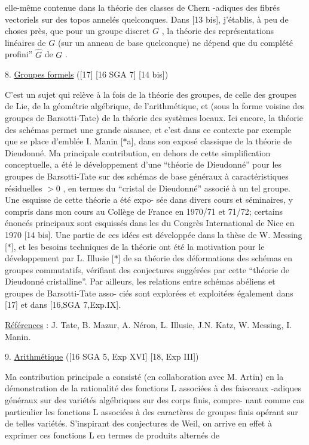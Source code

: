 
elle-même contenue dans la théorie des classes de Chern \hand{$\ell$}-adiques des fibrés
vectoriels sur des topos annelés quelconques. Dans [13 bis], j'établis, à peu
de choses près, que pour un groupe discret $G$ , la théorie des représentations
linéaires de $G$ (sur un anneau de base quelconque) ne dépend que du
complété profini'' $\hat{G}$ de $G$ .

8. \uline{Groupes formels} ([17] [16 SGA 7] [14 bis])

C'est un sujet qui relève à la fois de la théorie des groupes, de
celle des groupes de Lie, de la géométrie algébrique, de l'arithmétique, et
(sous la forme voisine des groupes de Barsotti-Tate) de la théorie des systèmes
locaux. Ici encore, la théorie des schémas permet une grande aisance, et c'est
dans ce contexte par exemple que se place d'emblée I. Manin [$*$a], dans son
exposé classique de la théorie de Dieudonné. Ma principale contribution, en
dehors de cette simplification conceptuelle, a été le développement d'une
``théorie de Dieudonné'' pour les groupes de Barsotti-Tate sur des schémas de
base généraux à caractéristiques résiduelles $>0$ , en termes du ``cristal de
Dieudonné'' associé à un tel groupe. Une esquisse de cette théorie a été expo-%
sée dans divers cours et séminaires, y compris dans mon cours au Collège de
France en 1970/71 et 71/72; certains énoncés principaux sont esquissés dans
les  du Congrès International de Nice en 1970 [14 bis]. Une partie de ces
idées est développée dans la thèse de W. Messing [$*$], et les besoins techniques
de la théorie ont été la motivation pour le développement par L. Illusie [$*$]
de sa théorie des déformations des schémas en groupes commutatifs, vérifiant
des conjectures suggérées par cette ``théorie de Dieudonné cristalline''. Par
ailleurs, les relations entre schémas abéliens et groupes de Barsotti-Tate asso-%
ciés sont explorées et exploitées également dans [17] et dans [16,SGA 7,Exp.IX].

\uline{Références} : J. Tate, B. Mazur, A. Néron, L. Illusie, J.N. Katz, W. Messing,
I. Manin.

9. \uline{Arithmétique} ([16 SGA 5, Exp XVI] [18, Exp III])

Ma contribution principale a consisté (en collaboration avec M. Artin)
en la démonstration de la rationalité des fonctions L associées à des faisceaux
\hand{$\ell$}-adiques généraux sur des variétés algébriques sur des corps finis, compre-%
nant comme cas particulier les fonctions L associées à des caractères de groupes
finis opérant sur de telles variétés. S'inspirant des conjectures de Weil, on
arrive en effet à exprimer ces fonctions L en termes de produits alternés de


